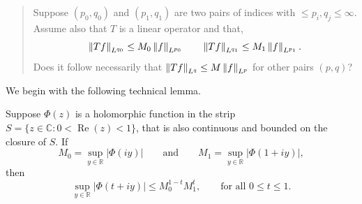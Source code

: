 \documentclass{article}
\begin{document}
\begin{quote}
	Suppose $(p_{0}, q_{0})$ and $(p_{1}, q_{1})$ are two pairs of indices with $ \leq p_{i}, q_{j} \leq \infty$. Assume also that $T$ is a linear operator and that, 
	\begin{equation*}
		\left\Vert Tf \right\Vert_{L^{q_{0}}} \leq M_{0}\left\Vert f \right\Vert_{L^{p_{0}}} \qquad \left\Vert Tf \right\Vert_{L^{q_{1}}} \leq M_{1}\left\Vert f \right\Vert_{L^{p_{1}}}. 
	\end{equation*}
	Does it follow necessarily that $\left\Vert Tf \right\Vert_{L^{q}} \leq M\left\Vert f \right\Vert_{L^{p}}$ for other pairs $(p,q)$? 
\end{quote}


We begin with the following technical lemma. 

\begin{lemma}
	Suppose $\Phi(z)$ is a holomorphic function in the strip $S = \{z \in \mathbb{C}: 0 < \operatorname{Re}(z) < 1\}$, that is also continuous and bounded on the closure of $S$. If 
	\begin{equation*}
		M_{0} = \sup_{y \in \mathbb{R}}|\Phi(iy)| \qquad \text{and} \qquad M_{1} = \sup_{y \in \mathbb{R}}|\Phi(1 + iy)|, 
	\end{equation*}
	then 
	\begin{equation*}
		\sup_{y \in \mathbb{R}}|\Phi(t + iy)| \leq M_{0}^{1 - t}M_{1}^{t}, \qquad \text{for all $0 \leq t \leq 1$}. 
	\end{equation*}
\end{lemma} 
\end{document}
